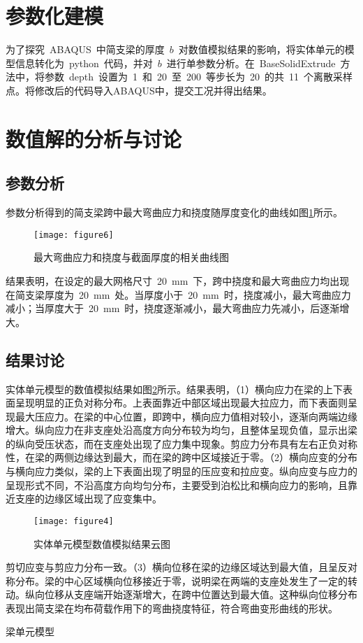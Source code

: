 \section{参数化建模}
为了探究~ABAQUS~中简支梁的厚度~$b$~对数值模拟结果的影响，将实体单元的模型信息转化为~python~代码，并对~$b$~进行单参数分析。在~BaseSolidExtrude~方法中，将参数~depth~设置为~1~和~20~至~200~等步长为~20~的共~11~个离散采样点。将修改后的代码导入ABAQUS中，提交工况并得出结果。
\section{数值解的分析与讨论}
\subsection{参数分析}
参数分析得到的简支梁跨中最大弯曲应力和挠度随厚度变化的曲线如图\ref{fig:para}所示。
\begin{figure}[htbp]
    \centering
	\texttt{[image: figure6]}
    \caption{最大弯曲应力和挠度与截面厚度的相关曲线图}
    \label{fig:para}
\end{figure}
结果表明，在设定的最大网格尺寸~20~mm~下，跨中挠度和最大弯曲应力均出现在简支梁厚度为~20~mm~处。当厚度小于~20~mm~时，挠度减小，最大弯曲应力减小；当厚度大于~20~mm~时，挠度逐渐减小，最大弯曲应力先减小，后逐渐增大。

\subsection{结果讨论}
实体单元模型的数值模拟结果如图\ref{fig:fea}所示。结果表明，（1）横向应力在梁的上下表面呈现明显的正负对称分布。上表面靠近中部区域出现最大拉应力，而下表面则呈现最大压应力。在梁的中心位置，即跨中，横向应力值相对较小，逐渐向两端边缘增大。纵向应力在非支座处沿高度方向分布较为均匀，且整体呈现负值，显示出梁的纵向受压状态，而在支座处出现了应力集中现象。剪应力分布具有左右正负对称性，在梁的两侧边缘达到最大，而在梁的跨中区域接近于零。（2）横向应变的分布与横向应力类似，梁的上下表面出现了明显的压应变和拉应变。纵向应变与应力的呈现形式不同，不沿高度方向均匀分布，主要受到泊松比和横向应力的影响，且靠近支座的边缘区域出现了应变集中。
\begin{figure}[htbp]
    \centering
	\texttt{[image: figure4]}
    \caption{实体单元模型数值模拟结果云图}
    \label{fig:fea}
\end{figure}
剪切应变与剪应力分布一致。（3）横向位移在梁的边缘区域达到最大值，且呈反对称分布。梁的中心区域横向位移接近于零，说明梁在两端的支座处发生了一定的转动。纵向位移从支座端开始逐渐增大，在跨中位置达到最大值。这种纵向位移分布表现出简支梁在均布荷载作用下的弯曲挠度特征，符合弯曲变形曲线的形状。

梁单元模型
